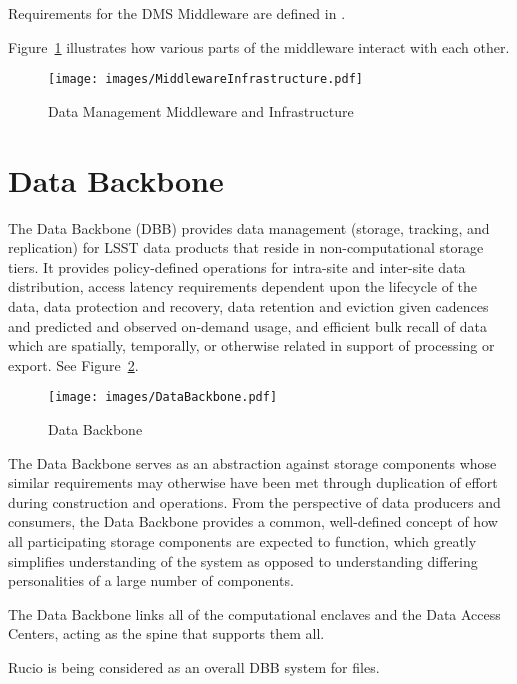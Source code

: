 \documentclass[DM,toc]{lsstdoc}
\begin{document}
Requirements for the DMS Middleware are defined in .

Figure~\ref{fig:mwandinfra} illustrates how various parts of the middleware
interact with each other.

\begin{figure}
\centering
\texttt{[image: images/MiddlewareInfrastructure.pdf]}
\caption{Data Management Middleware and Infrastructure}
\label{fig:mwandinfra}
\end{figure}

\section{Data Backbone}\label{data-backbone}

The Data Backbone (DBB) provides data management (storage, tracking, and
replication) for LSST data products that reside in non-computational storage
tiers.  It provides policy-defined operations for intra-site and inter-site
data distribution, access latency requirements dependent upon the lifecycle of
the data, data protection and recovery, data retention and eviction given
cadences and predicted and observed on-demand usage, and efficient bulk recall
of data which are spatially, temporally, or otherwise related in support of
processing or export.  See Figure~\ref{fig:data-backbone}.

\begin{figure}
\centering
\texttt{[image: images/DataBackbone.pdf]}
\caption{Data Backbone}
\label{fig:data-backbone}
\end{figure}

The Data Backbone serves as an abstraction against storage components whose
similar requirements may otherwise have been met through duplication of effort
during construction and operations. From the perspective of data producers and
consumers, the Data Backbone provides a common, well-defined concept of how all
participating storage components are expected to function, which greatly
simplifies understanding of the system as opposed to understanding differing
personalities of a large number of components.

The Data Backbone links all of the computational enclaves and the Data Access
Centers, acting as the spine that supports them all.

Rucio \citep{Rucio} is being considered as an overall DBB system for files.
\end{document}
